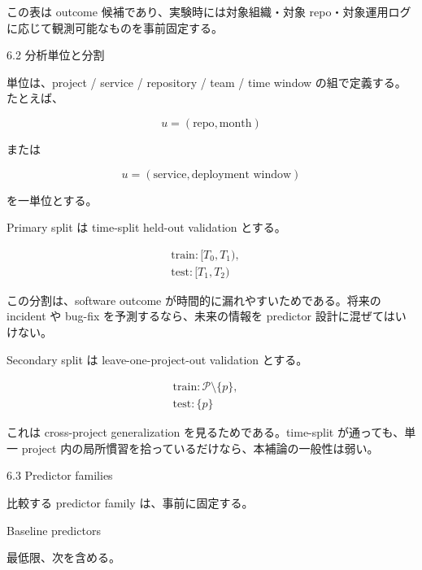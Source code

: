 \documentclass[12pt,a4paper]{article}
\begin{document}
この表は outcome 候補であり、実験時には対象組織・対象 repo・対象運用ログに応じて観測可能なものを事前固定する。

6.2 分析単位と分割

単位は、project / service / repository / team / time window の組で定義する。たとえば、

\[
u = (\text{repo}, \text{month})
\]

または

\[
u = (\text{service}, \text{deployment window})
\]

を一単位とする。

Primary split は time-split held-out validation とする。

\[
\begin{aligned}
\text{train}: [T_0, T_1), \quad \\
\text{test}: [T_1, T_2)
\end{aligned}
\]

この分割は、software outcome が時間的に漏れやすいためである。将来の incident や bug-fix を予測するなら、未来の情報を predictor 設計に混ぜてはいけない。

Secondary split は leave-one-project-out validation とする。

\[
\begin{aligned}
\text{train}: \mathcal P \setminus \{p\}, \quad \\
\text{test}: \{p\}
\end{aligned}
\]

これは cross-project generalization を見るためである。time-split が通っても、単一 project 内の局所慣習を拾っているだけなら、本補論の一般性は弱い。

6.3 Predictor families

比較する predictor family は、事前に固定する。

Baseline predictors

最低限、次を含める。
\end{document}
